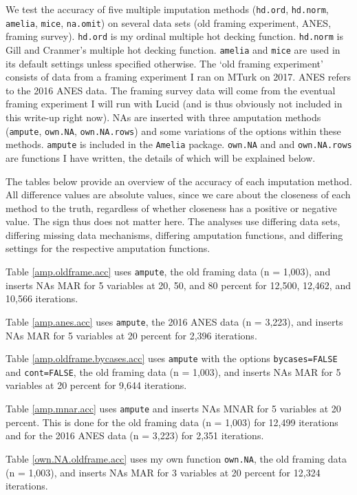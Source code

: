 \documentclass[12pt,econ]{sources/authesis}
\begin{document}
We test the accuracy of five multiple imputation methods (\texttt{hd.ord}, \texttt{hd.norm}, \texttt{amelia}, \texttt{mice}, \texttt{na.omit}) on several data sets (old framing experiment, ANES, framing survey). \texttt{hd.ord} is my ordinal multiple hot decking function. \texttt{hd.norm} is Gill and Cranmer's multiple hot decking function. \texttt{amelia} and \texttt{mice} are used in its default settings unless specified otherwise. The `old framing experiment' consists of data from a framing experiment I ran on MTurk on 2017. ANES refers to the 2016 ANES data. The framing survey data will come from the eventual framing experiment I will run with Lucid (and is thus obviously not included in this write-up right now). NAs are inserted with three amputation methods (\texttt{ampute}, \texttt{own.NA}, \texttt{own.NA.rows}) and some variations of the options within these methods. \texttt{ampute} is included in the \texttt{Amelia} package. \texttt{own.NA} and and \texttt{own.NA.rows} are functions I have written, the details of which will be explained below.

The tables below provide an overview of the accuracy of each imputation method. All difference values are absolute values, since we care about the closeness of each method to the truth, regardless of whether closeness has a positive or negative value. The sign thus does not matter here. The analyses use differing data sets, differing missing data mechanisms, differing amputation functions, and differing settings for the respective amputation functions.

Table \ref{amp.oldframe.acc} uses \texttt{ampute}, the old framing data (n = 1,003), and inserts NAs MAR for 5 variables at 20, 50, and 80 percent for 12,500, 12,462, and 10,566 iterations.

Table \ref{amp.anes.acc} uses \texttt{ampute}, the 2016 ANES data (n = 3,223), and inserts NAs MAR for 5 variables at 20 percent for 2,396 iterations.

Table \ref{amp.oldframe.bycases.acc} uses \texttt{ampute} with the options \texttt{bycases=FALSE} and \texttt{cont=FALSE}, the old framing data (n = 1,003), and inserts NAs MAR for 5 variables at 20 percent for 9,644 iterations.

Table \ref{amp.mnar.acc} uses \texttt{ampute} and inserts NAs MNAR for 5 variables at 20 percent. This is done for the old framing data (n = 1,003) for 12,499 iterations and for the 2016 ANES data (n = 3,223) for 2,351 iterations.

Table \ref{own.NA.oldframe.acc} uses my own function \texttt{own.NA}, the old framing data (n = 1,003), and inserts NAs MAR for 3 variables at 20 percent for 12,324 iterations.
\end{document}
